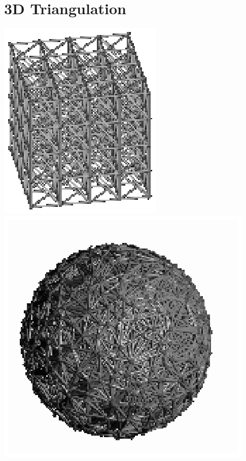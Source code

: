 \chapter{3D Triangulation}
\label{chapter-Triangulation3}
\begin{ccTexOnly}
\vspace*{-2cm}
\includegraphics{grille.eps} \hspace*{2cm} 
\includegraphics{sphere.eps} 
\end{ccTexOnly}
